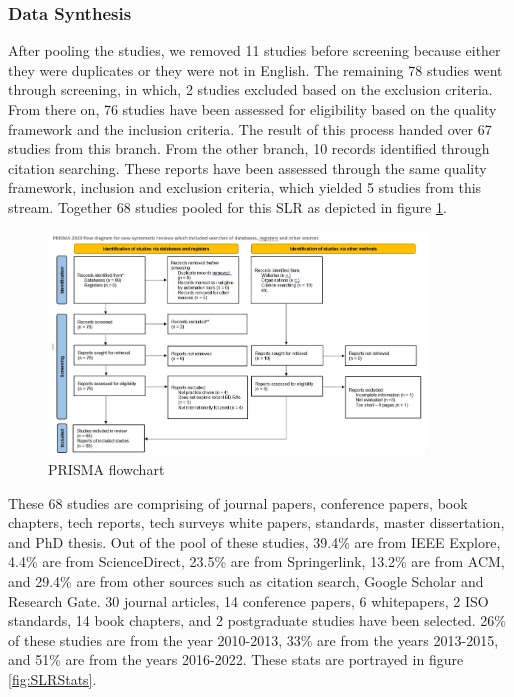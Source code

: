 \documentclass[review]{elsarticle}
\begin{document}
\subsubsection{Data Synthesis}

After pooling the studies, we removed 11 studies before screening because either they were duplicates or they were not in English. The remaining 78 studies went through screening, in which, 2 studies excluded based on the exclusion criteria. From there on, 76 studies have been assessed for eligibility based on the quality framework and the inclusion criteria. The result of this process handed over 67 studies from this branch. From the other branch, 10 records identified through citation searching. These reports have been assessed through the same quality framework, inclusion and exclusion criteria, which yielded 5 studies from this stream. Together 68 studies pooled for this SLR as depicted in figure \ref{fig:PRISMA}.

\begin{figure}[h!]
    \centering
    \includegraphics[width=10cm]{PRISMA.JPG}
    \caption{PRISMA flowchart}
    \label{fig:PRISMA}
\end{figure}


These 68 studies are comprising of journal papers, conference papers, book chapters, tech reports, tech surveys white papers, standards, master dissertation, and PhD thesis. Out of the pool of these studies, 39.4\% are from IEEE Explore, 4.4\% are from ScienceDirect, 23.5\% are from Springerlink, 13.2\% are from ACM, and 29.4\% are from other sources such as citation search, Google Scholar and Research Gate. 30 journal articles, 14 conference papers, 6 whitepapers, 2 ISO standards, 14 book chapters, and 2 postgraduate studies have been selected. 26\% of these studies are from the year 2010-2013, 33\% are from the years 2013-2015, and 51\% are from the years 2016-2022. These stats are portrayed in figure \ref{fig:SLRStats}.
\end{document}
